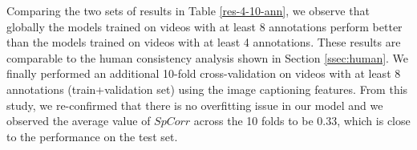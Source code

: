 \documentclass[sigconf]{acmart}
\begin{document}
Comparing the two sets of results in Table \ref{res-4-10-ann}, we observe that globally the models trained on videos with at least 8 annotations perform better than the models trained on videos with at least 4 annotations.
These results are comparable to the human consistency analysis shown in Section \ref{ssec:human}.
We finally performed an additional 10-fold cross-validation on videos with at least 8 annotations (train+validation set) using the image captioning features. From this study, we re-confirmed that there is no overfitting issue in our model and we observed the average value of $SpCorr$ across the 10 folds to be 0.33, which is close to the performance on the test set.

\end{document}

